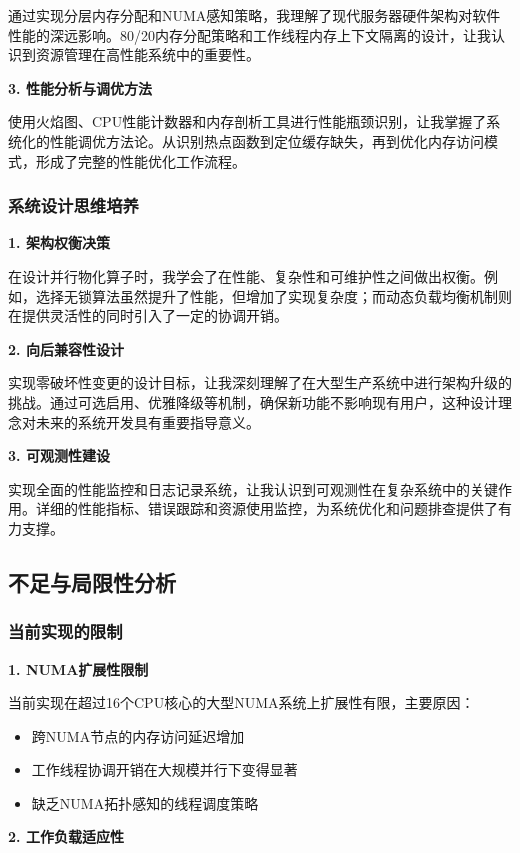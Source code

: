 通过实现分层内存分配和NUMA感知策略，我理解了现代服务器硬件架构对软件性能的深远影响。80/20内存分配策略和工作线程内存上下文隔离的设计，让我认识到资源管理在高性能系统中的重要性。

\textbf{3. 性能分析与调优方法}

使用火焰图、CPU性能计数器和内存剖析工具进行性能瓶颈识别，让我掌握了系统化的性能调优方法论。从识别热点函数到定位缓存缺失，再到优化内存访问模式，形成了完整的性能优化工作流程。

\subsubsection{系统设计思维培养}

\textbf{1. 架构权衡决策}

在设计并行物化算子时，我学会了在性能、复杂性和可维护性之间做出权衡。例如，选择无锁算法虽然提升了性能，但增加了实现复杂度；而动态负载均衡机制则在提供灵活性的同时引入了一定的协调开销。

\textbf{2. 向后兼容性设计}

实现零破坏性变更的设计目标，让我深刻理解了在大型生产系统中进行架构升级的挑战。通过可选启用、优雅降级等机制，确保新功能不影响现有用户，这种设计理念对未来的系统开发具有重要指导意义。

\textbf{3. 可观测性建设}

实现全面的性能监控和日志记录系统，让我认识到可观测性在复杂系统中的关键作用。详细的性能指标、错误跟踪和资源使用监控，为系统优化和问题排查提供了有力支撑。

\subsection{不足与局限性分析}

\subsubsection{当前实现的限制}

\textbf{1. NUMA扩展性限制}

当前实现在超过16个CPU核心的大型NUMA系统上扩展性有限，主要原因：
\begin{itemize}
    \item 跨NUMA节点的内存访问延迟增加
    \item 工作线程协调开销在大规模并行下变得显著
    \item 缺乏NUMA拓扑感知的线程调度策略
\end{itemize}

\textbf{2. 工作负载适应性}

